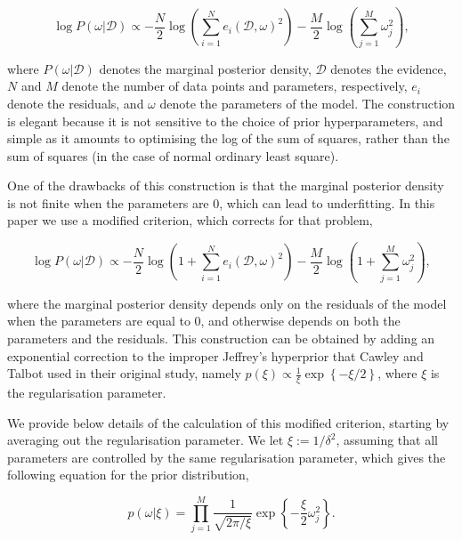 \documentclass[11pt, oneside]{article}
\begin{document}
\vspace{-0.5cm}
\begin{equation}
	\log P(\omega | \mathcal{D}) \propto - \frac{N}{2} \log \left(\sum_{i=1}^{N} e_i(\mathcal{D},\omega)^2\right) - \frac{M}{2} \log \left(\sum_{j=1}^{M} \omega_{j}^2 \right),
\end{equation}

where $P(\omega|\mathcal{D})$ denotes the marginal posterior density, $\mathcal{D}$ denotes the evidence, $N$ and $M$ denote the number of data points and parameters, respectively, $e_i$ denote the residuals, and $\omega$ denote the parameters of the model.
The construction is elegant because it is not sensitive to the choice of prior hyperparameters, and simple as it amounts to optimising the log of the sum of squares, rather than the sum of squares (in the case of normal ordinary least square).

One of the drawbacks of this construction is that the marginal posterior density is not finite when the parameters are 0, which can lead to underfitting.
In this paper we use a modified criterion, which corrects for that problem,

\vspace{-0.5cm}
\begin{equation}
	\log P(\omega | \mathcal{D}) \propto - \frac{N}{2} \log \left(1 + \sum_{i=1}^{N} e_i(\mathcal{D},\omega)^2\right) - \frac{M}{2} \log \left(1 + \sum_{j=1}^{M} \omega_{j}^2 \right),
\end{equation}

where the marginal posterior density depends only on the residuals of the model when the parameters are equal to 0, and otherwise depends on both the parameters and the residuals. 
This construction can be obtained by adding an exponential correction to the improper Jeffrey's hyperprior that Cawley and Talbot used in their original study, namely $p(\xi) \propto \frac{1}{\xi} \exp\left\{- \xi/2 \right\}$, where $\xi$ is the regularisation parameter. 

We provide below details of the calculation of this modified criterion, starting by averaging out the regularisation parameter.
We let $\xi := 1/\delta^2$, assuming that all parameters are controlled by the same regularisation parameter, which gives the following equation for the prior distribution,

\vspace{-0.5cm}
\begin{equation}
    p(\omega | \xi) = \prod_{j=1}^{M} \frac{1}{\sqrt{2\pi/\xi}}  \exp \left\{ -\frac{\xi}{2} \omega_j^2 \right\}.
\end{equation}
\end{document}

